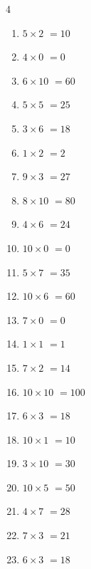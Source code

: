 \begin{multicols}{4}
\begin{enumerate}
  \item $5\times 2$
        $=10$

  \item $4\times 0$
        $=0$

  \item $6\times 10$
        $=60$

  \item $5\times 5$
        $=25$

  \item $3\times 6$
        $=18$

  \item $1\times 2$
        $=2$

  \item $9\times 3$
        $=27$

  \item $8\times 10$
        $=80$

  \item $4\times 6$
        $=24$

  \item $10\times 0$
        $=0$

  \item $5\times 7$
        $=35$

  \item $10\times 6$
        $=60$

  \item $7\times 0$
        $=0$

  \item $1\times 1$
        $=1$

  \item $7\times 2$
        $=14$

  \item $10\times 10$
        $=100$

  \item $6\times 3$
        $=18$

  \item $10\times 1$
        $=10$

  \item $3\times 10$
        $=30$

  \item $10\times 5$
        $=50$

  \item $4\times 7$
        $=28$

  \item $7\times 3$
        $=21$

  \item $6\times 3$
        $=18$


\end{enumerate}
\end{multicols}
